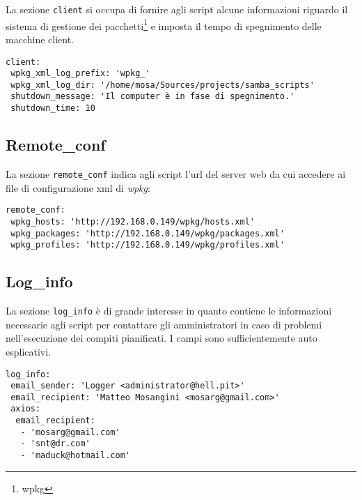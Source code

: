 \documentclass[a4paper,10pt,oneside]{memoir}
\begin{document}
La sezione \verb#client# si occupa di fornire agli script alcune informazioni riguardo il sistema di gestione dei pacchetti\footnote{wpkg} e imposta il tempo di spegnimento delle macchine client.

\begin{verbatim}
client:
 wpkg_xml_log_prefix: 'wpkg_'
 wpkg_xml_log_dir: '/home/mosa/Sources/projects/samba_scripts'
 shutdown_message: 'Il computer è in fase di spegnimento.'
 shutdown_time: 10 
\end{verbatim}


\subsection*{Remote\_conf}

La sezione \verb#remote_conf# indica agli script l'url del server web da cui accedere ai file di configurazione xml di \emph{wpkg}:
\begin{verbatim}
remote_conf:
 wpkg_hosts: 'http://192.168.0.149/wpkg/hosts.xml'
 wpkg_packages: 'http://192.168.0.149/wpkg/packages.xml'
 wpkg_profiles: 'http://192.168.0.149/wpkg/profiles.xml' 
\end{verbatim}


\subsection*{Log\_info}

La sezione \verb#log_info# è di grande interesse in quanto contiene le informazioni necessarie agli script per contattare gli amministratori in caso di problemi nell'esecuzione dei compiti pianificati. I campi sono sufficientemente auto esplicativi.

\begin{verbatim}
log_info: 
 email_sender: 'Logger <administrator@hell.pit>'
 email_recipient: 'Matteo Mosangini <mosarg@gmail.com>'
 axios:
  email_recipient:
   - 'mosarg@gmail.com'
   - 'snt@dr.com'
   - 'maduck@hotmail.com' 
\end{verbatim}
\end{document}
